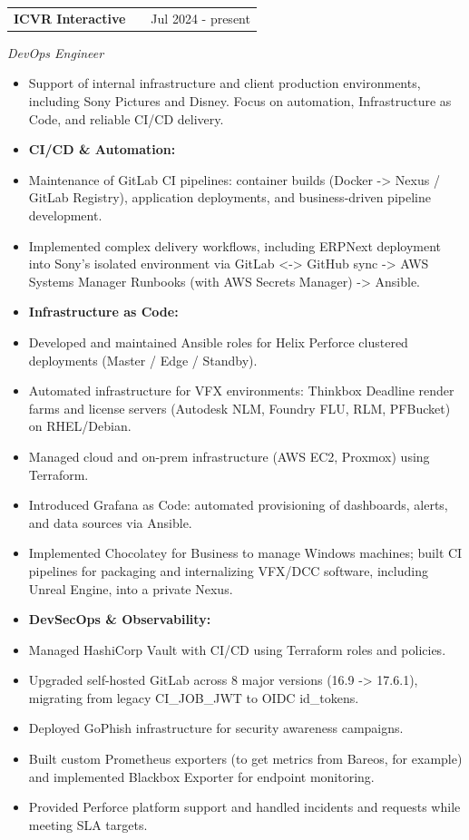 \documentclass[a4paper,12pt]{article}
\makeatletter
\newenvironment{joblong}[3]
    {
    \begin{tabularx}{\linewidth}{@{}l X r@{}}
    \textbf{#1} & \hfill &  #2 \\[3.75pt]
    \end{tabularx}
    {\itshape #3}\par\vspace{2pt}
    \begin{itemize}[nosep,after=\strut, leftmargin=1em, itemsep=4pt,label=-]
    }
    {
    \end{itemize}
    }
\makeatother
\begin{document}
\begin{joblong}{ICVR Interactive}{Jul 2024 - present}{DevOps Engineer}
\item[] Support of internal infrastructure and client production environments, including Sony Pictures and Disney. Focus on automation, Infrastructure as Code, and reliable CI/CD delivery.
\item[] \textbf{CI/CD \& Automation:}\smallskip
\item Maintenance of GitLab CI pipelines: container builds (Docker -> Nexus / GitLab Registry), application deployments, and business-driven pipeline development.
\item Implemented complex delivery workflows, including ERPNext deployment into Sony's isolated environment via GitLab <-> GitHub sync -> AWS Systems Manager Runbooks (with AWS Secrets Manager) -> Ansible.
\item[] \textbf{Infrastructure as Code:}\smallskip
\item Developed and maintained Ansible roles for Helix Perforce clustered deployments (Master / Edge / Standby).
\item Automated infrastructure for VFX environments: Thinkbox Deadline render farms and license servers (Autodesk NLM, Foundry FLU, RLM, PFBucket) on RHEL/Debian.
\item Managed cloud and on-prem infrastructure (AWS EC2, Proxmox) using Terraform.
\item Introduced Grafana as Code: automated provisioning of dashboards, alerts, and data sources via Ansible.
\item Implemented Chocolatey for Business to manage Windows machines; built CI pipelines for packaging and internalizing VFX/DCC software, including Unreal Engine, into a private Nexus.
\item[] \textbf{DevSecOps \& Observability:}\smallskip
\item Managed HashiCorp Vault with CI/CD using Terraform roles and policies.
\item Upgraded self-hosted GitLab across 8 major versions (16.9 -> 17.6.1), migrating from legacy CI\_JOB\_JWT to OIDC id\_tokens.
\item Deployed GoPhish infrastructure for security awareness campaigns.
\item Built custom Prometheus exporters (to get metrics from Bareos, for example) and implemented Blackbox Exporter for endpoint monitoring.
\item Provided Perforce platform support and handled incidents and requests while meeting SLA targets.
\end{joblong}
\end{document}
